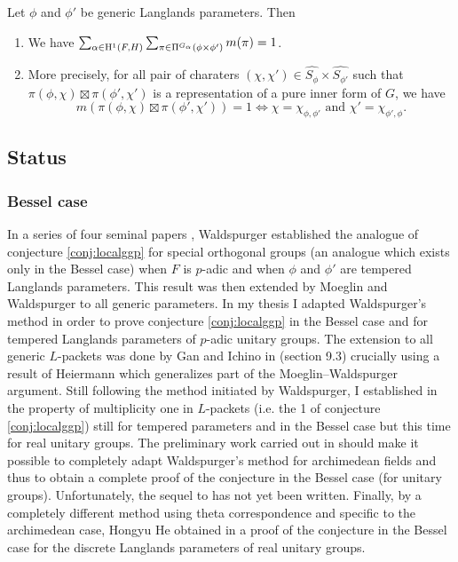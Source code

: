 \begin{conjecture}
\label{conj:localggp}
Let $\phi$ and $\phi'$ be generic Langlands parameters.
Then
\begin{enumerate}
    \item We have $\sum_{\alpha \in \mathrm{H}^1(F, H)} \sum_{\pi \in \Pi^{G_\alpha}(\phi \times \phi')} m(\pi) = 1$.
    \item More precisely, for all pair of charaters $(\chi, \chi') \in \widehat{S_\phi} \times \widehat{S_{\phi'}}$ such that $\pi(\phi, \chi) \boxtimes \pi(\phi', \chi')$ is a representation of a pure inner form of $G$, we have
    \[
        m(\pi(\phi, \chi) \boxtimes \pi(\phi', \chi')) = 1 \Leftrightarrow \chi = \chi_{\phi, \phi'}\text{ and }\chi' = \chi_{\phi', \phi}.
    \]
\end{enumerate}
\end{conjecture}


\subsection{Status}

\subsubsection{Bessel case}

In a series of four seminal papers \cite{waldspurger1990demonstration,waldspurger2010formule,waldspurger2012calcul,waldspurger2012conjecture}, Waldspurger established the analogue of conjecture \ref{conj:localggp} for special orthogonal groups (an analogue which exists only in the Bessel case) when $F$ is $p$-adic and when $\phi$ and $\phi'$ are tempered Langlands parameters.
This result was then extended by Moeglin and Waldspurger \cite{moeglin2012conjecture} to all generic parameters.
In my thesis \cite{beuzart2014expression,beuzart2015endoscopie,beuzart2016conjecture} I adapted Waldspurger's method in order to prove conjecture \ref{conj:localggp} in the Bessel case and for tempered Langlands parameters of $p$-adic unitary groups.
The extension to all generic $L$-packets was done by Gan and Ichino in \cite{gan2016gross} (section 9.3) crucially using a result of Heiermann \cite{heiermann2016note} which generalizes part of the Moeglin--Waldspurger argument.
Still following the method initiated by Waldspurger, I established in \cite{beuzart2015local} the property of multiplicity one in $L$-packets (i.e. the 1 of conjecture \ref{conj:localggp}) still for tempered parameters and in the Bessel case but this time for real unitary groups. 
The preliminary work carried out in \cite{beuzart2015local} should make it possible to completely adapt Waldspurger's method for archimedean fields and thus to obtain a complete proof of the conjecture in the Bessel case (for unitary groups).
Unfortunately, the sequel to \cite{beuzart2015local} has not yet been written.
Finally, by a completely different method using theta correspondence and specific to the archimedean case, Hongyu He obtained in \cite{he2017gan} a proof of the conjecture in the Bessel case for the discrete Langlands parameters of real unitary groups.


